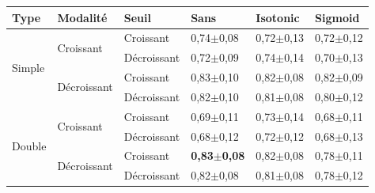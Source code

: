 \begin{table}[H]
    \begin{tabular}{llllll}
        \toprule 
        Type                    & Modalité                          & Seuil             & Sans                  & Isotonic              & Sigmoid               \\ \midrule
        \multirow{4}{*}{Simple} & \multirow{2}{*}{Croissant}        & Croissant         & 0,74$\pm$0,08         & 0,72$\pm$0,13         & 0,72$\pm$0,12         \\ \cline{3-6}
                                &                                   & Décroissant       & 0,72$\pm$0,09         & 0,74$\pm$0,14         & 0,70$\pm$0,13         \\ \cline{2-6}
                                & \multirow{2}{*}{Décroissant}      & Croissant         & 0,83$\pm$0,10         & 0,82$\pm$0,08         & 0,82$\pm$0,09         \\ \cline{3-6}
                                &                                   & Décroissant       & 0,82$\pm$0,10         & 0,81$\pm$0,08         & 0,80$\pm$0,12         \\ \cline{1-6}
        \multirow{4}{*}{Double} & \multirow{2}{*}{Croissant}        & Croissant         & 0,69$\pm$0,11         & 0,73$\pm$0,14         & 0,68$\pm$0,11         \\ \cline{3-6}
                                &                                   & Décroissant       & 0,68$\pm$0,12         & 0,72$\pm$0,12         & 0,68$\pm$0,13         \\ \cline{2-6}
                                & \multirow{2}{*}{Décroissant}      & Croissant         & \textbf{0,83$\pm$0,08}& 0,82$\pm$0,08         & 0,78$\pm$0,11         \\ \cline{3-6}
                                &                                   & Décroissant       & 0,82$\pm$0,08         & 0,81$\pm$0,08         & 0,78$\pm$0,12         \\ \bottomrule
    \end{tabular}
\end{table}

